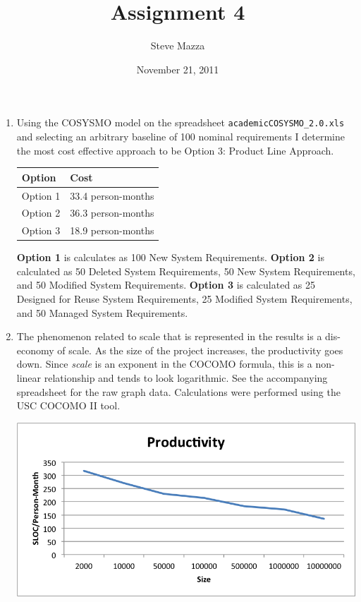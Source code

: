 \documentclass[letterpaper,10pt]{article}
\title{Assignment 4}
\author{Steve Mazza}
\date{November 21, 2011}
\begin{document}
\maketitle

\begin{enumerate}
	\item Using the COSYSMO model on the spreadsheet \texttt{academicCOSYSMO\_2.0.xls} and selecting an arbitrary baseline of 100 nominal requirements I determine the most cost effective approach to be Option 3: Product Line Approach.
	\begin{table}[htdp]
\begin{center}
\begin{tabular}{ll}
\hline
\textbf{Option} & \textbf{Cost} \\
\hline
Option 1 & 33.4 person-months \\
Option 2 & 36.3 person-months \\
Option 3 & 18.9 person-months \\
\hline
\end{tabular}
\end{center}
\end{table}%
	\par 
	\textbf{Option 1} is calculates as 100 New System Requirements.  \textbf{Option 2} is calculated as 50 Deleted System Requirements, 50 New System Requirements, and 50 Modified System Requirements.  \textbf{Option 3} is calculated as 25 Designed for Reuse System Requirements, 25 Modified System Requirements, and 50 Managed System Requirements.
	\item The phenomenon related to scale that is represented in the results is a dis-economy of scale.  As the size of the project increases, the productivity goes down.  Since \emph{scale} is an exponent in the COCOMO formula, this is a non-linear relationship and tends to look logarithmic. See the accompanying spreadsheet for the raw graph data.  Calculations were performed using the USC COCOMO II tool.
	\begin{center}
		\includegraphics[scale=0.75]{assignment4-1.png}

\end{center}
\end{enumerate}
\end{document}
